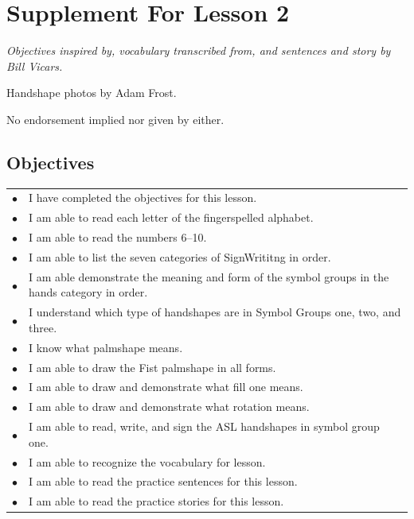 \documentclass{article}
\begin{document}
\newfontfamily{}
\newfontfamily{}
\newcommand{\bul}{\hfil$\bullet$&}
\renewenvironment{glossary}{\begin{multicols}{5}\begin{center}}{\end{center}\end{multicols}}
\setcounter{secnumdepth}{0}
\setlength{\columnseprule}{1pt}

\section{Supplement For Lesson 2}

\begin{center}
\it
Objectives inspired by, vocabulary transcribed from, and sentences and story by Bill Vicars.

Handshape photos by Adam Frost.

No endorsement implied nor given by either.
\end{center}

\subsection{Objectives}

\begin{tabular}{p{1cm}p{14cm}}
\bul I have completed the objectives for this lesson.\\
\bul I am able to read each letter of the fingerspelled alphabet.\\
\bul I am able to read the numbers 6--10.\\
\bul I am able to list the seven categories of SignWrititng in order.\\
\bul I am able demonstrate the meaning and form of the symbol groups in the hands category in order.\\
\bul I understand which type of handshapes are in Symbol Groups one, two, and three.\\
\bul I know what palmshape means.\\
\bul I am able to draw the Fist palmshape in all forms.\\
\bul I am able to draw and demonstrate what fill one means.\\
\bul I am able to draw and demonstrate what rotation means.\\
\bul I am able to read, write, and sign the ASL handshapes in symbol group one.\\
\bul I am able to recognize the vocabulary for lesson.\\
\bul I am able to read the practice sentences for this lesson.\\
\bul I am able to read the practice stories for this lesson.\\
\end{tabular}
\end{document}
